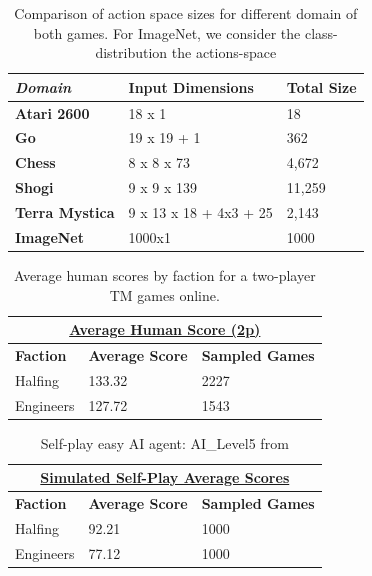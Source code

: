 \documentclass[12pt,twocolumn,letterpaper]{article}
\begin{document}
\begin{table}[h!]
\begin{tabular}{|l|l|l|}
\hline
\textit{\textbf{Domain}} & \textbf{Input Dimensions} & \textbf{Total Size} \\ \hline
\textbf{Atari 2600}      & 18 x 1               & 18              \\ \hline
\textbf{Go}              & 19 x 19 + 1              & 362               \\ \hline
\textbf{Chess}           & 8 x 8 x 73               & 4,672               \\ \hline
\textbf{Shogi}           & 9 x 9 x 139               & 11,259              \\ \hline
\textbf{Terra Mystica}   & 9 x 13 x 18 + 4x3 + 25 &   2,143            \\ \hline
\textbf{ImageNet}        & 1000x1                 & 1000              \\ \hline
\end{tabular}
\caption{Comparison of action space sizes for different domain of both games. For ImageNet, we consider the class-distribution the actions-space}
\label{table:output_size_comparison}
\end{table}


\begin{table}[h!]
\begin{tabular}{|l|l|l|}
\hline
\multicolumn{3}{|c|}{{\ul \textbf{Average Human Score (2p)}}}      \\ \hline
\textbf{Faction} & \textbf{Average Score} & \textbf{Sampled Games} \\ \hline
Halfing          & 133.32                 & 2227                   \\ \hline
Engineers        & 127.72                 & 1543                   \\ \hline
\end{tabular}
\caption{Average human scores by faction for a two-player TM games online.}
\label{table:average_2p_score}
\end{table}

\begin{table}[h!]
\begin{tabular}{|l|l|l|}
\hline
\multicolumn{3}{|c|}{{\ul \textbf{Simulated Self-Play Average Scores}}}      \\ \hline
\textbf{Faction} & \textbf{Average Score} & \textbf{Sampled Games} \\ \hline
Halfing          & 92.21                 & 1000                   \\ \hline
Engineers        & 77.12                 & 1000                   \\ \hline
\end{tabular}
\caption{Self-play easy AI agent: AI\_Level5 from \cite{TMStatsAI}}
\label{table:average_2p_score}
\end{table}
\end{document}
